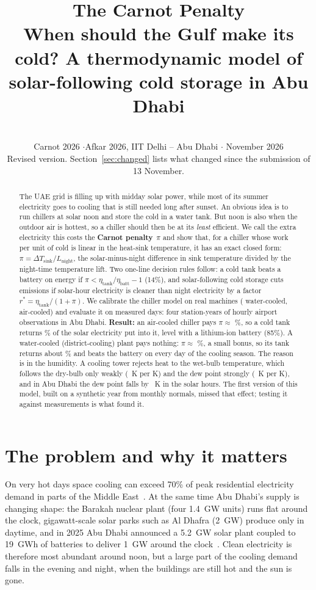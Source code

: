 \documentclass[10pt,a4paper]{article}
\title{\vspace{-1.2cm}\textbf{The Carnot Penalty}\\[2pt]
\large When should the Gulf make its cold? A thermodynamic model of solar-following cold storage in Abu Dhabi}
\author{\TEAMNAME \\ \small Carnot 2026 \quad$\cdot$\quad Afkar 2026, IIT Delhi -- Abu Dhabi \quad$\cdot$\quad 14 November 2026\\
\small Revised version. Section~\ref{sec:changed} lists what changed since the submission of 13 November.}
\date{}
\begin{document}
\maketitle
\vspace{-0.9cm}
\begin{abstract}\noindent
The UAE grid is filling up with midday solar power, while most of its summer electricity goes to cooling
that is still needed long after sunset. An obvious idea is to run chillers at solar noon and store the cold
in a water tank. But noon is also when the outdoor air is hottest, so a chiller should then be at its
\emph{least} efficient. We call the extra electricity this costs the \textbf{Carnot penalty}~$\pi$ and show that,
for a chiller whose work per unit of cold is linear in the heat-sink temperature, it has an exact closed form:
$\pi=\Delta T_{\text{sink}}/L_{\text{night}}$, the solar-minus-night difference in sink temperature divided by
the night-time temperature lift. Two one-line decision rules follow: a cold tank beats a battery on energy if
$\pi<\eta_{\text{tank}}/\eta_{\text{batt}}-1$ (14\%), and solar-following cold storage cuts emissions if solar-hour
electricity is cleaner than night electricity by a factor $r^*=\eta_{\text{tank}}/(1+\pi)$.
We calibrate the chiller model on \NMachines{} real machines (\NWC{} water-cooled, \NAC{} air-cooled) and evaluate it
on \NDays{} measured days: four station-years of hourly airport observations in Abu Dhabi.
\textbf{Result:} an air-cooled chiller pays $\pi\approx$ \PiAC\%, so a cold tank returns \EffRoundAC\% of the solar
electricity put into it, level with a lithium-ion battery (85\%). A water-cooled (district-cooling) plant pays
nothing: $\pi\approx$ \PiWC\%, a small bonus, so its tank returns about \EffRoundWC\% and beats the battery on every
day of the cooling season. The reason is in the humidity. A cooling tower rejects heat to the wet-bulb
temperature, which follows the dry-bulb only weakly (\DampA~K per K) and the dew point strongly (\DampB~K per K),
and in Abu Dhabi the dew point falls by \DTdpAbs~K in the solar hours. The first version of this model, built on a
synthetic year from monthly normals, missed that effect; testing it against measurements is what found it.
\end{abstract}

\section{The problem and why it matters}
On very hot days space cooling can exceed 70\% of peak residential electricity demand in parts of the Middle
East~\cite{iea}. At the same time Abu Dhabi's supply is changing shape: the Barakah nuclear plant (four 1.4~GW units)
runs flat around the clock, gigawatt-scale solar parks such as Al Dhafra (2~GW) produce only in daytime, and in 2025
Abu Dhabi announced a 5.2~GW solar plant coupled to 19~GWh of batteries to deliver 1~GW around the clock~\cite{rtc}.
Clean electricity is therefore most abundant around noon, but a large part of the cooling demand falls in the
evening and night, when the buildings are still hot and the sun is gone.
\end{document}
